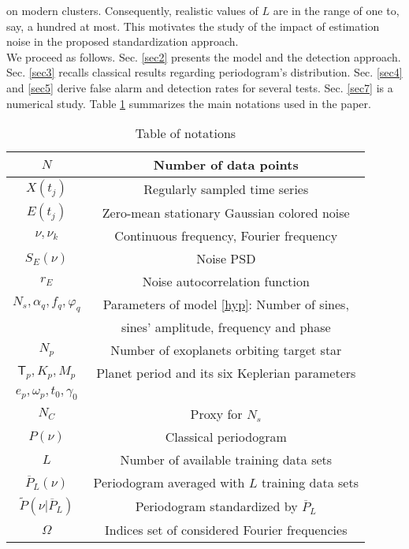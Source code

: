 \documentclass[journal]{IEEEtran}
\begin{document}
on modern clusters. 
Consequently, realistic values of $L$ are in the range of one to, say,  a hundred at most. This motivates the study of the impact of estimation noise in the proposed standardization approach. \\
We proceed as follows. { Sec.} \ref{sec2} presents the model and the detection approach. Sec. \ref{sec3} recalls classical results regarding periodogram's distribution.
Sec. \ref{sec4} and  \ref{sec5}  derive false alarm and detection rates for several tests. Sec. \ref{sec7}
is a numerical study. Table \ref{tab1} summarizes the main notations used in the paper.
  {
\begin{table}[ht!] 
 \caption{Table of notations}
   \label{tab1} 
\begin{tabular}{|c|c|} 
\hline
	$  N$ & Number of data points \\%
\hline
	$  X(t_j)$ &  Regularly sampled time series  \\[0.1cm] 
\hline
	$ E(t_j)$ &  Zero-mean stationary Gaussian colored noise  \\[0.1cm] 
\hline
	$\nu,  \nu_k$ &  Continuous frequency, Fourier frequency\\[0.1cm] 
	\hline
	$ S_E(\nu)$ &  Noise PSD  \\[0.1cm] 
\hline
	$ r_E$ &  Noise autocorrelation function \\[0.1cm] 
\hline
	 $  N_s, \alpha_q, f_q, \varphi_q $ &  Parameters of model \eqref{hyp}: Number of sines,\\
	 & sines' amplitude, frequency and phase \\[0.1cm] 
\hline
	$ N_p $ & Number of exoplanets orbiting target star \\[0.1cm] 
\hline
	$\textsf{T}_p, K_p,M_p$ & Planet period and its six Keplerian parameters\\
	$e_p,\omega_p,t_0,\gamma_0$ &  \\%
\hline
	$ N_C $ & Proxy for $N_s$ \\[0.1cm] 
\hline
	$ P(\nu)$ &  Classical periodogram \\[0.1cm] 
\hline
	 $  L$ &  Number of available training data sets  \\[0.1cm] 
\hline
	$ \overline{P}_L(\nu)$ &  Periodogram averaged with $L$ training data sets \\[0.1cm] 
\hline
	$ \widetilde{P}(\nu|\overline{P}_L)$ &  Periodogram standardized by $ \overline{P}_L$ \\[0.1cm] 
\hline
	$ \Omega $ & Indices set of considered Fourier frequencies \\[0.1cm] 

\end{tabular}
\end{table}}
\end{document}
